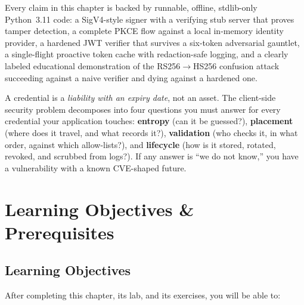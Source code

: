 Every claim in this chapter is backed by runnable, offline, stdlib-only
Python~3.11 code: a SigV4-style signer with a verifying stub server that
proves tamper detection, a complete PKCE flow against a local in-memory
identity provider, a hardened JWT verifier that survives a six-token
adversarial gauntlet, a single-flight proactive token cache with
redaction-safe logging, and a clearly labeled educational demonstration of
the RS256$\rightarrow$HS256 confusion attack succeeding against a naive
verifier and dying against a hardened one.

\begin{keyconceptbox}
A credential is a \emph{liability with an expiry date}, not an asset. The
client-side security problem decomposes into four questions you must answer
for every credential your application touches: \textbf{entropy} (can it be
guessed?), \textbf{placement} (where does it travel, and what records it?),
\textbf{validation} (who checks it, in what order, against which
allow-lists?), and \textbf{lifecycle} (how is it stored, rotated, revoked,
and scrubbed from logs?). If any answer is ``we do not know,'' you have a
vulnerability with a known CVE-shaped future.
\end{keyconceptbox}

\section{Learning Objectives \& Prerequisites}
\label{sec:ch5-objectives}

\subsection*{Learning Objectives}
After completing this chapter, its lab, and its exercises, you will be able to:

